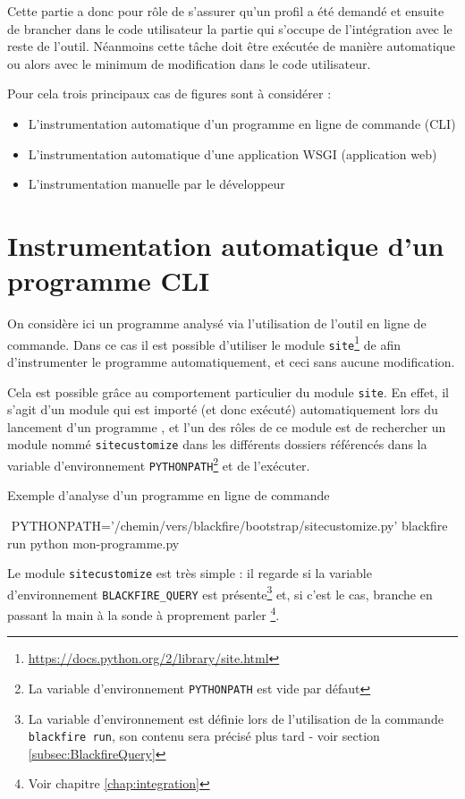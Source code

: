 Cette partie a donc pour rôle de s'assurer qu'un profil a été demandé et ensuite de brancher dans le \gls{code utilisateur} la partie qui s'occupe de l'intégration avec le reste de l'outil. Néanmoins cette tâche doit être exécutée de manière automatique ou alors avec le minimum de modification dans le code utilisateur.

Pour cela trois principaux cas de figures sont à considérer :
\begin{itemize}
\item L'instrumentation automatique d'un programme en ligne de commande (\gls{CLI})
\item L'instrumentation automatique d'une application \gls{WSGI} (application web)
\item L'instrumentation manuelle par le développeur
\end{itemize}

\section[Programme CLI]{Instrumentation automatique d'un programme CLI}
\label{sec:instru-pythonpath}
On considère ici un programme analysé via l'utilisation de l'outil en ligne de commande. Dans ce cas il est possible d'utiliser le module \verb|site|\footnote{\url{https://docs.python.org/2/library/site.html}} de \Python afin d'instrumenter le programme automatiquement, et ceci sans aucune modification.

Cela est possible grâce au comportement particulier du module \verb|site|. En effet, il s'agit d'un module qui est importé (et donc exécuté) automatiquement lors du lancement d'un programme \Python, et l'un des rôles de ce module est de rechercher un module nommé \verb|sitecustomize| dans les différents dossiers référencés dans la variable d'environnement \verb|PYTHONPATH|\footnote{La variable d'environnement \verb?PYTHONPATH? est vide par défaut} et de l'exécuter.

\begin{listing}[H]
\caption{Exemple d'analyse d'un programme en ligne de commande}
\begin{bashcode}
 $ $ PYTHONPATH='/chemin/vers/blackfire/bootstrap/sitecustomize.py' blackfire run python mon-programme.py
\end{bashcode}
\end{listing}

Le module \verb|sitecustomize| est très simple : il regarde si la variable d'environnement \verb|BLACKFIRE_QUERY| est présente\footnote{La variable d'environnement est définie lors de l'utilisation de la commande \verb|blackfire run|, son contenu sera précisé plus tard - voir section \vref{subsec:BlackfireQuery}} et, si c'est le cas, branche \Blackfire en passant la main à la sonde à proprement parler \footnote{Voir chapitre \vref{chap:integration}}.

